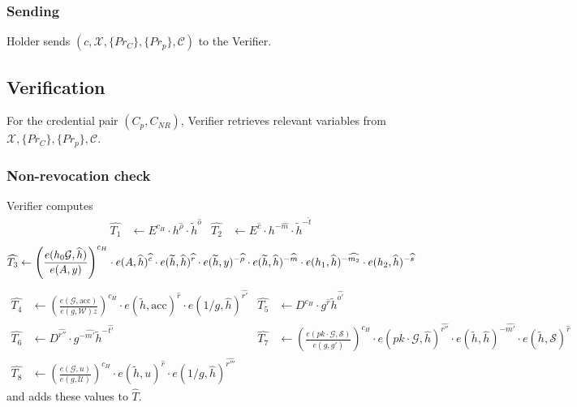 \documentclass[a4paper]{article}
\begin{document}
\subsubsection{Sending}\label{sec:send}
 Holder sends $(c,\mathcal{X},\{Pr_C\},\{Pr_p\},\mathcal{C})$  to the Verifier.

\subsection{Verification}\label{sec:verify}
For the credential pair $(C_p,C_{NR})$, Verifier retrieves relevant variables from $\mathcal{X},\{Pr_C\},\{Pr_p\},\mathcal{C}$.

\subsubsection{Non-revocation check}

Verifier computes
\begin{align}
\widehat{T_1}&\leftarrow E^{c_H}\cdot h^{\widehat{\rho}} \cdot \widetilde{h}^{\widehat{o}} &
\widehat{T_2}&\leftarrow E^{\widehat{c}}\cdot h^{-\widehat{m}}\cdot\widetilde{h}^{-\widehat{t}}
\end{align}
\begin{equation}
\widehat{T_3}\leftarrow\left(\frac{e(h_0\mathcal{G},\widehat{h})}{e(A,y)} \right)^{c_H} \cdot e(A,\widehat{h})^{\widehat{c}}\cdot e(\widetilde{h},\widehat{h})^{\widehat{r}}\cdot
e(\widetilde{h},y)^{-\widehat{\rho}}\cdot
e(\widetilde{h},\widehat{h})^{-\widehat{m}}\cdot
e(h_1,\widehat{h})^{-\widehat{m_2}}\cdot e(h_2,\widehat{h})^{-\widehat{s}}\\
\end{equation}
\begin{align}
\widehat{T_4}&\leftarrow\left(\frac{e(\mathcal{G},\mathrm{acc})}{e(g,\mathcal{W})z}\right)^{c_H} \cdot e(\widetilde{h},\mathrm{acc})^{\widehat{r}}\cdot
e(1/g,\widehat{h})^{\widehat{r'}}
&
\widehat{T_5}&\leftarrow D^{c_H}\cdot g^{\widehat{r}}\widetilde{h}^{\widehat{o'}}\\
\widehat{T_6}&\leftarrow  D^{\widehat{r''}}\cdot g^{-\widehat{m'}}
\widetilde{h}^{-\widehat{t'}}&
\widehat{T_7}&\leftarrow
\left(\frac{e(pk\cdot\mathcal{G},\mathcal{S})}{e(g,g')}\right)^{c_H}\cdot e(pk\cdot \mathcal{G},\widehat{h})^{\widehat{r''}}\cdot
e(\widetilde{h},\widehat{h})^{-\widehat{m'}}\cdot
e(\widetilde{h},\mathcal{S})^{\widehat{r}}\\
\widehat{T_8}&\leftarrow \left(\frac{e(\mathcal{G},u)}{e(g,\mathcal{U})}\right)^{c_H}\cdot e(\widetilde{h},u)^{\widehat{r}}
\cdot e(1/g,\widehat{h})^{\widehat{r'''}}
\end{align}
and adds these values to $\widehat{T}$.
\end{document}
